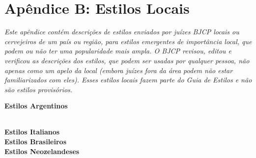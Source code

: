 \clearpage
{}
\divisorLine
\section*{Apêndice B: Estilos Locais}

\textit{Este apêndice contém descrições de estilos enviados por juízes BJCP locais ou cervejeiros de um país ou região, para estilos emergentes de importância local, que podem ou não ter uma popularidade mais ampla. O BJCP revisou, editou e verificou as descrições dos estilos, que podem ser usadas por qualquer pessoa, não apenas como um apelo da local (embora juízes fora da área podem não estar familiarizados com eles). Esses estilos locais fazem parte do Guia de Estilos e não são estilos provisórios.}

\begin{multicols*}{2}

  \textbf{\Large\color{blue}Estilos Argentinos }
  
	\\

  \textbf{\Large\color{blue}Estilos Italianos }
	\\

  \textbf{\Large\color{blue}Estilos Brasileiros }
	\\

  \textbf{\Large\color{blue}Estilos Neozelandeses }

	

\end{multicols*}
